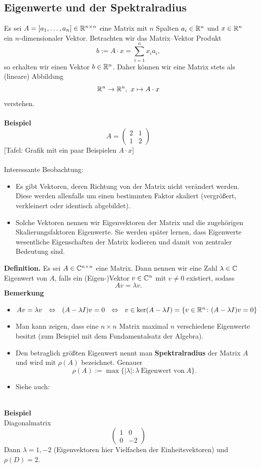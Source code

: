 \subsection{Eigenwerte und der Spektralradius}
Es sei $A = [a_1,\ldots, a_n]\in{\mathbb{R}}^{n\times n}$ eine Matrix mit $n$ Spalten $a_i \in {\mathbb{R}}^{n}$ und $x \in {\mathbb{R}}^{n}$ ein $n$-dimensionaler Vektor. Betrachten wir das Matrix--Vektor Produkt
$$b := A\cdot x = \sum_{i=1}^n x_i a_i,$$
so erhalten wir einen Vektor $b \in {\mathbb{R}}^{n}$. Daher können wir eine Matrix stets als (lineare) Abbildung
$${\mathbb{R}}^{n} \to {\mathbb{R}}^{n}, ~x \mapsto A\cdot x $$
verstehen.~\\~\\
\textbf{Beispiel}\\
$$
A = \begin{pmatrix}
   2 & 1\\1&2
\end{pmatrix}
$$
[Tafel: Grafik mit ein paar Beispielen $A\cdot x$]\\~\\
Interessante Beobachtung:
\begin{itemize}
	\item Es gibt Vektoren, deren Richtung von der Matrix nicht verändert werden. Diese werden allenfalls um einen bestimmten Faktor skaliert (vergrößert, verkleinert oder identisch abgebildet).
	\item Solche Vektoren nennen wir Eigenvektoren der Matrix und die zugehörigen Skalierungsfaktoren Eigenwerte. Sie werden später lernen, dass Eigenwerte wesentliche Eigenschaften der Matrix kodieren und damit von zentraler Bedeutung sind.
\end{itemize}
\textbf{Definition.} Es sei $A\in {\mathbb{C}}^{n \times n}$ eine Matrix. Dann nennen wir eine Zahl $\lambda \in {\mathbb{C}}$ Eigenwert von $A$, falls ein (Eigen-)Vektor $v \in  {\mathbb{C}}^n$ mit $v \neq 0$ existiert, sodass
$$Av = \lambda v. $$
%
\textbf{Bemerkung}
\begin{itemize}
	\item $Av = \lambda v ~~\Leftrightarrow~~ (A-\lambda I)v = 0 ~~\Leftrightarrow~~ v \in \text{ker}(A-\lambda I)=\{v \in {\mathbb{R}}^{n}\colon (A-\lambda I)v = 0\} $
	\item Man kann zeigen, dass eine $n \times n$ Matrix maximal $n$ verschiedene Eigenwerte besitzt (zum Beispiel mit dem Fundamentalsatz der Algebra).
	\item Den betraglich größten Eigenwert nennt man \textbf{Spektralradius} der Matrix $A$ und wird mit $\rho(A)$ bezeichnet. Genauer
	$$\rho(A) := \max\{|\lambda|: \lambda ~\text{Eigenwert von}~A\} .$$
	\item Siehe auch: \cite[Def. 2.30]{Meister}
\end{itemize}
~\\
\textbf{Beispiel}\\
Diagonalmatrix $$\begin{pmatrix}
1&0\\0&-2
\end{pmatrix} $$
Dann $\lambda = 1,-2$ (Eigenvektoren hier Vielfachen der Einheitsvektoren) und $\rho(D) = 2$.


